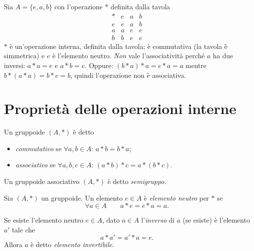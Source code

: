 \documentclass[11pt,a4paper]{article}
\begin{document}
\begin{esempio}
Sia $A = \{e, a, b\}$ con l'operazione $*$ definita dalla tavola
\[
\begin{array}{c|ccc}
  * & e & a & b \\ \hline
  e & e & a & b \\
  a & a & e & e \\
  b & b & e & e
\end{array}
\]
$*$ è un'operazione interna, definita dalla tavola; è commutativa (la tavola è simmetrica) e $e$ è l'elemento neutro. \emph{Non} vale l'associatività perché $a$ ha due inversi: $a * a = e$ e $a * b = e$. Oppure: $(b * a) * a = e * a = a$ mentre $b * (a * a) = b * e = b$, quindi l'operazione non è associativa.
\end{esempio}

\section{Proprietà delle operazioni interne}

\begin{definizione}
Un gruppoide $(A, *)$ è detto
\begin{itemize}
  \item \emph{commutativo} se $\forall a, b \in A$: $a * b = b * a$;
  \item \emph{associativo} se $\forall a, b, c \in A$: $(a * b) * c = a * (b * c)$.
\end{itemize}
Un gruppoide associativo $(A, *)$ è detto \emph{semigruppo}.
\end{definizione}

\begin{definizione}
Sia $(A, *)$ un gruppoide. Un elemento $e \in A$ è \emph{elemento neutro} per $*$ se
\[
  \forall a \in A \qquad a * e = e * a = a .
\]
\end{definizione}

\begin{definizione}
Se esiste l'elemento neutro $e \in A$, dato $a \in A$ l'\emph{inverso} di $a$ (se esiste) è l'elemento $a'$ tale che
\[
  a * a' = a' * a = e .
\]
Allora $a$ è detto \emph{elemento invertibile}.
\end{definizione}
\end{document}
